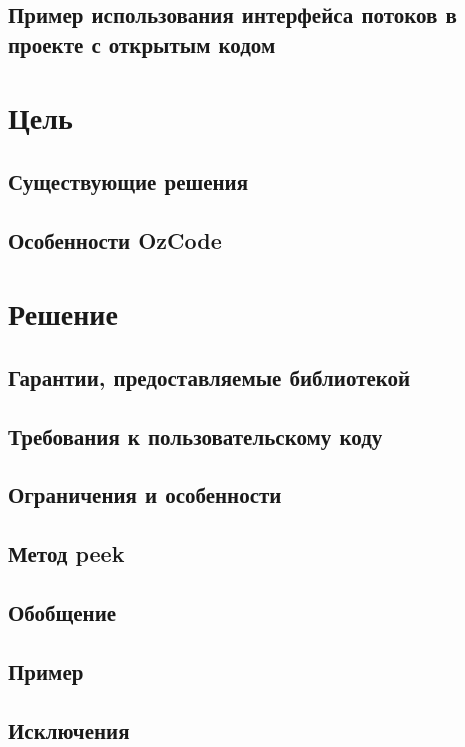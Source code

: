 \subsection{Пример использования интерфейса потоков в проекте с открытым кодом}


\section{Цель}

\subsection{Существующие решения}

\subsection{Особенности OzCode}


\section{Решение}
\subsection{Гарантии, предоставляемые библиотекой}

\subsection{Требования к пользовательскому коду}

\subsection{Ограничения и особенности}

\subsection{Метод peek}


\subsection{Обобщение}

\subsection{Пример}

\subsection{Исключения}

